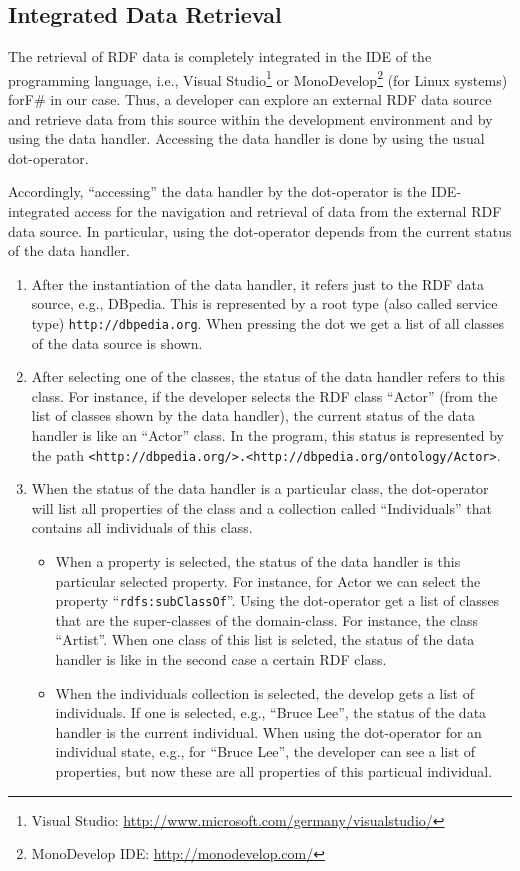 \documentclass{llncs} %
\newcommand{\fs}{\textsf{F\#}\xspace}
\begin{document}
\subsection{Integrated Data Retrieval}

The retrieval of RDF data is completely integrated in the IDE of the programming language,
i.e., Visual Studio\footnote{Visual Studio: \url{http://www.microsoft.com/germany/visualstudio/}}
or MonoDevelop\footnote{MonoDevelop IDE: \url{http://monodevelop.com/}} (for Linux systems) for\fs in our case.
Thus, a developer can explore an external RDF data source and retrieve data from this source
within the development environment and by using the data handler.
Accessing the data handler is done by using  the usual dot-operator.

Accordingly, ``accessing'' the data handler by the dot-operator is the IDE-integrated
access for the navigation and retrieval of data from the external RDF data source.
In particular, using the dot-operator depends from the current status of
the data handler. 

\begin{enumerate}
	\item After the instantiation of the data handler, it refers just
	       to the RDF data source, e.g., DBpedia. This is represented
	   by a root type (also called service type) \texttt{http://dbpedia.org}.
		  When pressing the dot we get a list of all  classes of the data source is shown.
	\item After selecting one of the classes, the status of the data handler refers to this class.
	    For instance, if the developer selects the RDF class ``Actor'' (from the list of classes shown by the data handler),
			the current status of the data handler is like an ``Actor'' class. In the program,
			this status is represented by the path \texttt{<http://dbpedia.org/>.<http://dbpedia.org/ontology/Actor>}.
  \item When the status of the data handler is a particular class,
		the dot-operator will list all properties of the class and a collection
		called ``Individuals'' that contains all individuals of this class.
		 \begin{itemize}
			 \item When a property is selected, the status of the data handler is this
			   particular selected property. For instance, for Actor we can select the
				  property ``\texttt{rdfs:subClassOf}''. Using the dot-operator get a list of classes
					 that are the super-classes of the domain-class. For instance, the class ``Artist''.
					 When one class of this list is selcted, the status of the data handler is
					 like in the second case a certain RDF class.
				\item When the individuals collection is selected, the develop gets
					a list of individuals. If one is selected, e.g., ``Bruce Lee'', the
					status of the data handler is the current individual.
					When using the dot-operator for an individual state,
					 e.g., for ``Bruce Lee'', the developer can see a list of properties,
					but now these are all properties of this particual individual.
		 \end{itemize}
\end{enumerate}
\end{document}
